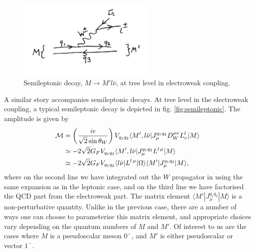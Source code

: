 \begin{figure}
  \vspace{-10pt}
  \begin{center}
    \includegraphics[width=0.6\textwidth]{images/semileptonicdecay.jpg}
  \end{center}
  \vspace{-30pt}
  \caption{Semileptonic decay, $M\to M'l\bar{\nu}$, at tree level in electroweak coupling.}
  \label{fig:semileptonicdecay}
\end{figure}

A similar story accompanies semileptonic decays. At tree level in the electroweak coupling, a typical semileptonic decay is depicted in fig. \ref{fig:semileptonic}. The amplitude is given by
\begin{align}
  \nonumber
  \mathcal{M} & = \left( { ie \over \sqrt{2} \sin\theta_W }\right) V_{q_1q_2} \langle M', l\bar{\nu} | J_{\mu}^{q_1q_2} D_W^{\mu\nu} L^l_{\nu} | M \rangle \\
  \nonumber
  & \simeq -2\sqrt{2} G_F V_{q_1q_2} \langle M', l\bar{\nu} | J_{\mu}^{q_1q_2} L^{l\, \mu} | M \rangle \\
  & \simeq -2\sqrt{2} G_F V_{q_1q_2} \langle l\bar{\nu} | L^{l\,\mu} | \Omega \rangle \langle M' | J_{\mu}^{q_1q_2} | M \rangle,
  \label{eq:semileptonic}
\end{align}
where on the second line we have integrated out the $W$ propagator in using the same expansion as in the leptonic case, and on the third line we have factorised the QCD part from the electroweak part. The matrix element $\langle M' | J_{\mu}^{q_1q_2} | M \rangle$ is a non-perturbative quantity. Unlike in the previous case, there are a number of ways one can choose to parameterise this matrix element, and appropriate choices vary depending on the quantum numbers of $M$ and $M'$. Of interest to us are the cases where $M$ is a pseudoscalar meson $0^-$, and $M'$ is either pseudoscalar or vector $1^-$.

